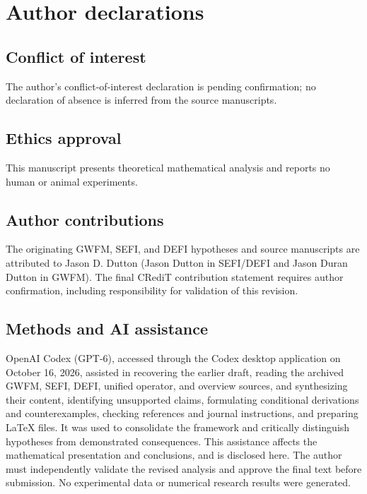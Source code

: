 \documentclass[aip,jmp,reprint,onecolumn,amsmath,amssymb]{revtex4-2}
\begin{document}
\section*{Author declarations}
\subsection*{Conflict of interest}
The author's conflict-of-interest declaration is pending confirmation; no declaration of absence is inferred from the source manuscripts.
\subsection*{Ethics approval}
This manuscript presents theoretical mathematical analysis and reports no human or animal experiments.
\subsection*{Author contributions}
The originating GWFM, SEFI, and DEFI hypotheses and source manuscripts are attributed to Jason D. Dutton (Jason Dutton in SEFI/DEFI and Jason Duran Dutton in GWFM). The final CRediT contribution statement requires author confirmation, including responsibility for validation of this revision.
\subsection*{Methods and AI assistance}
OpenAI Codex (GPT-6), accessed through the Codex desktop application on October 16, 2026, assisted in recovering the earlier draft, reading the archived GWFM, SEFI, DEFI, unified operator, and overview sources, and synthesizing their content, identifying unsupported claims, formulating conditional derivations and counterexamples, checking references and journal instructions, and preparing \LaTeX{} files. It was used to consolidate the framework and critically distinguish hypotheses from demonstrated consequences. This assistance affects the mathematical presentation and conclusions, and is disclosed here. The author must independently validate the revised analysis and approve the final text before submission. No experimental data or numerical research results were generated.
\end{document}
